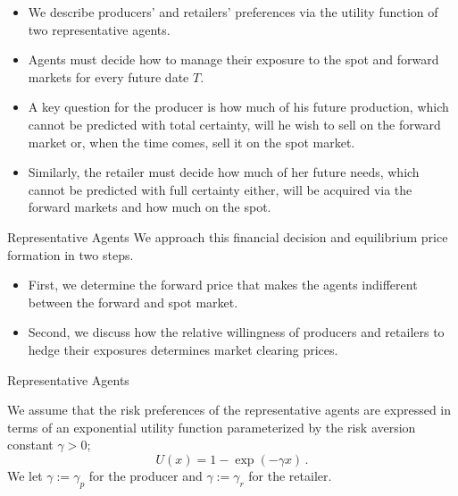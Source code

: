 \begin{itemize}
\item<1-> We describe producers' and retailers'
preferences via the utility function of two representative agents.
\item<2-> Agents
must decide how to manage their exposure to the spot and forward
markets for every future date $T$.
\item<3->
A key question for the producer
is how much of his future production, which cannot be predicted with
total certainty, will he wish to sell on the forward market or, when
the time comes, sell it on the spot market.
\item<4-> Similarly, the retailer
must decide how much of her future needs, which cannot be predicted
with full certainty either, will be acquired via the forward markets
and how much on the spot.
\end{itemize}



{Representative Agents}
We approach this financial decision and
equilibrium price formation in two steps.

\begin{itemize}
\item<1-> First, we determine the
forward price that makes the agents indifferent between the forward
and spot market.
\item<2-> Second, we discuss how the relative willingness
of producers and retailers to hedge their exposures determines
market clearing prices.
\end{itemize}





{Representative Agents}

We assume that the risk preferences of the representative agents are
expressed in terms of an exponential utility function parameterized
by the risk aversion constant $\gamma>0$;
$$
U(x)=1-\exp(-\gamma x)\,.
$$
We let $\gamma:=\gamma_p$ for the producer and $\gamma:=\gamma_r$
for the retailer.





